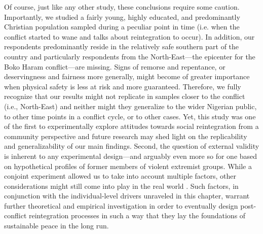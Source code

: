 Of course, just like any other study, these conclusions require some caution. Importantly, we studied a fairly young, highly educated, and predominantly Christian population sampled during a peculiar point in time (i.e. when the conflict started to wane and talks about reintegration to occur). In addition, our respondents predominantly reside in the relatively safe southern part of the country and particularly respondents from the North-East—the epicenter for the Boko Haram conflict—are missing. Signs of remorse and repentance, or deservingness and fairness more generally, might become of greater importance when physical safety is less at risk and more guaranteed. Therefore, we fully recognize that our results might not replicate in samples closer to the conflict (i.e., North-East) and neither might they generalize to the wider Nigerian public, to other time points in a conflict cycle, or to other cases. Yet, this study was one of the first to experimentally explore attitudes towards social reintegration from a community perspective and future research may shed light on the replicability and generalizability of our main findings. Second, the question of external validity is inherent to any experimental design---and arguably even more so for one based on hypothetical profiles of former members of violent extremist groups. While a conjoint experiment allowed us to take into account multiple factors, other considerations might still come into play in the real world \citep[such as the extension of vocational training to community members; see, e.g.,][]{Muggah2016}. Such factors, in conjunction with the individual-level drivers unraveled in this chapter, warrant further theoretical and empirical investigation in order to eventually design post-conflict reintegration processes in such a way that they lay the foundations of sustainable peace in the long run.


\cleardoublepage
